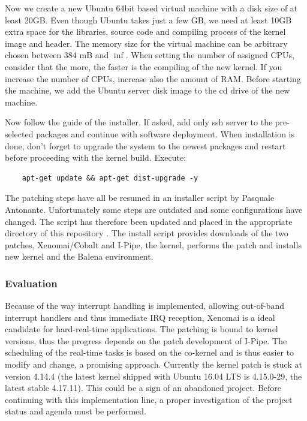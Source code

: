 \documentclass[]{scrartcl}
\begin{document}
Now we create a new Ubuntu 64bit based virtual machine with a disk size of at least 20GB. Even though Ubuntu takes just a few GB, we need at least 10GB extra space for the libraries, source code and compiling process of the kernel image and header. 
The memory size for the virtual machine can be arbitrary chosen between 384 mB and $\inf$. When setting the number of assigned CPUs, consider that the more, the faster is the compiling of the new kernel. If you increase the number of CPUs, increase also the amount of RAM.
Before starting the machine, we add the Ubuntu server disk image to the cd drive of the new machine.

Now follow the guide of the installer. If asked, add only ssh server to the pre-selected packages and continue with software deployment. When installation is done, don't forget to upgrade the system to the newest packages and restart before proceeding with the kernel build. Execute:

\begin{verbatim}
	apt-get update && apt-get dist-upgrade -y
\end{verbatim}

The patching steps have all be resumed in an installer script by Pasquale Antonante. Unfortunately some steps are outdated and some configurations have changed. The script has therefore been updated and placed in the appropriate directory of this repository \cite{gitrepo}. The install script provides downloads of the two patches, Xenomai/Cobalt and I-Pipe, the kernel, performs the patch and installs new kernel and the Balena environment.

\subsubsection{Evaluation}

Because of the way interrupt handling is implemented, allowing out-of-band interrupt handlers and thus immediate IRQ reception, Xenomai is a ideal candidate for hard-real-time applications. The patching is bound to kernel versions, thus the progress depends on the patch development of I-Pipe. 
The scheduling of the real-time tasks is based on the co-kernel and is thus easier to modify and change, a promising approach.
Currently the kernel patch is stuck at version 4.14.4 (the latest kernel shipped with Ubuntu 16.04 LTS is 4.15.0-29, the latest stable 4.17.11). This could be a sign of an abandoned project. Before continuing with this implementation line, a proper investigation of the project status and agenda must be performed.
\end{document}
